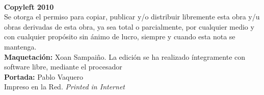 \noindent\textbf{\thetitle}\\
\theauthor

\vspace{2\baselineskip}

\footnotesize
\noindent\textbf{Copyleft \copyleft{} 2010 \theauthor}\\
Se otorga el permiso para copiar, publicar y/o distribuir libremente esta obra y/u obras derivadas de esta obra, ya sea total o parcialmente, por cualquier medio y con cualquier propósito sin ánimo de lucro, siempre y cuando esta nota se mantenga.\\

\noindent\textbf{Maquetación:} Xoan Sampaiño. La edición se ha realizado íntegramente con software libre, mediante el procesador \emph{\LaTeXe}\\
\noindent\textbf{Portada:} Pablo Vaquero\\

\noindent{}Impreso en la Red. \emph{Printed in Internet}
\normalsize
{}

\endinput

